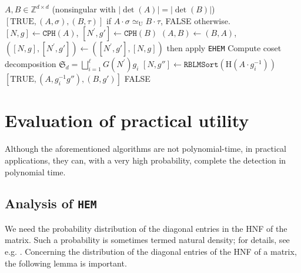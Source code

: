 \documentclass[reqno, 12pt]{article}
\theoremstyle{mydefinition}
\theoremstyle{myremark}
\numberwithin{algorithm}{section}
\newcommand{\h}{{\mathrm{H}}}
\begin{document}
\begin{algorithm}[h]
\caption{\texttt{HEM} (HNF-Based Equivalence Method)}
\label{alg-HEM}
\begin{algorithmic}[1]
\Require  $A, B \in \mathbb{Z}^{d \times d}$ (nonsingular with $|\det(A)|=|\det(B)|$)
\Ensure   $[\text{TRUE}, (A, \sigma), (B,\tau)]$ if $A \cdot \sigma \simeq_{\mathrm{U}} B \cdot\tau$, FALSE otherwise.
    \State  $[N,g] \gets \texttt{CPH}(A)$, $[N^\prime,g'] \gets \texttt{CPH}(B)$  
        \State $(A, B) \gets (B, A)$, $([N,g], [N^\prime,g']) \gets ([N^\prime,g'], [N,g])$
    \EndIf
     then apply \texttt{EHEM}
    \EndIf
    \State Compute coset decomposition $\mathfrak{S}_d = \bigsqcup_{i=1}^{\ell} G(N^\prime)g_i$
     
        \If{$\mathrm{G}( \h(A \cdot g_i^{-1})) = \mathrm{G}(N^\prime)$}
            \State $[N, g''] \gets \texttt{RBLMSort}(\h(A \cdot g_i^{-1}))$  
                \State \Return $[\text{TRUE}, (A, g_i^{-1} g''), (B, g')]$    
            \EndIf
        \EndIf
    \EndFor
    \State \Return FALSE
\end{algorithmic}
\end{algorithm}

\section{Evaluation of practical utility}

Although the aforementioned algorithms are not polynomial-time, in practical applications, they can, with a very high probability, complete the detection in polynomial time.

\subsection{Analysis of  \texttt{HEM}}

We need the probability distribution of the diagonal entries in the HNF of the matrix. Such a probability is sometimes termed natural density; for details, see e.g. \cite{NDensityDef}. Concerning the distribution of the diagonal entries of the HNF of a matrix, the following lemma is important.
\end{document}
